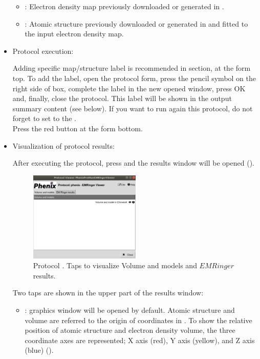 \begin{itemize}
    \begin{itemize}
     \item {}: Electron density map previously downloaded or generated in \scipion.
     \item {}: Atomic structure previously downloaded or generated in \scipion and fitted to the input electron density map.
    \end{itemize}
    
 \item Protocol execution:

  Adding specific map/structure label is recommended in  section, at the form top. To add the label, open the protocol form, press the pencil symbol on the right side of  box, complete the label in the new opened window, press OK and, finally, close the protocol. This label will be shown in the output summary content (see below). If you want to run again this protocol, do not forget to set to  the .\\
  Press the  red button at the form bottom.
  
 \item Visualization of protocol results:
  
  After executing the protocol, press  and the results window will be opened (). 
  
  \begin{figure}[H]
     \centering 
     \captionsetup{width=.9\linewidth} 
     \includegraphics[width=0.50\textwidth]{Images_appendix/Fig140.pdf}
     \caption{Protocol . Taps to visualize Volume and models and $EMRinger$ results.}
     \label{fig:app_protocol_emringer_2}
    \end{figure}
    
   Two taps are shown in the upper part of the results window:
    \begin{itemize}
     \item {}: \chimera graphics window will be opened by default. Atomic structure and volume are referred to the origin of coordinates in \chimera. To show the relative position of atomic structure and electron density volume, the three coordinate axes are represented; X axis (red), Y axis (yellow), and Z axis (blue) ().


\end{itemize}
\end{itemize}
